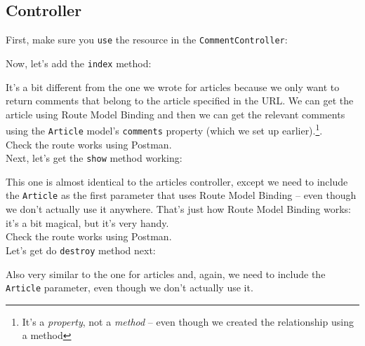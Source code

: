 \subsection{Controller}

First, make sure you \texttt{use} the resource in the \texttt{CommentController}:



Now, let's add the \texttt{index} method:


It's a bit different from the one we wrote for articles because we only want to return comments that belong to the article specified in the URL. We can get the article using Route Model Binding and then we can get the relevant comments using the \texttt{Article} model's \texttt{comments} property (which we set up earlier).\footnote{It's a \textit{property}, not a \textit{method} – even though we created the relationship using a method}.
\\

Check the route works using Postman.
\\

Next, let's get the \texttt{show} method working:


This one is almost identical to the articles controller, except we need to include the \texttt{Article} as the first parameter that uses Route Model Binding – even though we don't actually use it anywhere. That's just how Route Model Binding works: it's a bit magical, but it's very handy.
\\

Check the route works using Postman.
\\

Let's get do \texttt{destroy} method next:


Also very similar to the one for articles and, again, we need to include the \texttt{Article} parameter, even though we don't actually use it.

